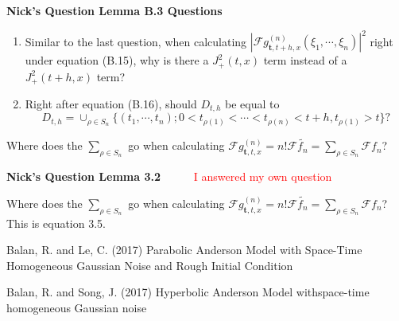 \documentclass[a4paper,11pt]{article}
\numberwithin{equation}{section}
\theoremstyle{plain}
\theoremstyle{definition}
\newcounter{NQ}
\newenvironment{NickQuestion}[1][] %
{\refstepcounter{NQ}
	\begin{mdframed}[backgroundcolor=lightgray]\textbf{Nick's Question \theNQ \: #1~~}~~~\noindent}%
	{\end{mdframed}}
\numberwithin{NQ}{section}
\numberwithin{LQ}{section}
\numberwithin{ZQ}{section}
\begin{document}
\begin{NickQuestion}[Lemma B.3 Questions]
\begin{enumerate}
\noindent\textbf{Relation to Raluca's paper \cite{BS2017}:} The corresponding result is found in Lemma 7.2 \cite{BS2017}. The proof is exactly the same up until Raluca's equation (80). However in equation (81), you can see that Raluca took a different approach to bound $\psi_{t,h,x}^{(n)}(\textbf{t,t})$ and in return the $A_n(t,h,x)$ function.

\textbf{Underline (2):} Why are we able to factor as was done in this step. Shouldn't we say that 
	\begin{align*}
			| \mathcal{F} & (g_{ \textbf{t}, t+h, x }^{(n)}  - g_{ \textbf{t}, t, x }^{(n)} ) (\xi_1 , \cdots , \xi_n)|^2 
			\\= \bigg| \lambda^n \prod_{k=1}^n & \exp\left( -\frac{1}{2}\frac{ t_{\rho(k+1)}  - t_{\rho(k)} }{ t_{\rho(k)}t_{\rho(k+1)} } \left| \sum_{j=1}^k t_{\rho(j)}\xi_{\rho(j)} \right|^2 \right) \cdots
			\\& - \lambda^n \prod_{k=1}^n \exp\left( -\frac{1}{2}\frac{ t_{\sigma(k+1)}  - t_{\sigma(k)} }{ t_{\sigma(k)}t_{\sigma(k+1)} } \left| \sum_{j=1}^k t_{\sigma(j)}\xi_{\sigma(j)} \right|^2 \right) \cdots \bigg|^2.	\end{align*}
In other words, the permutations are different so we can't factor like is done to get the first inequality after equation (B.11). 
	\item Similar to the last question, when calculating $ |\mathcal{F} g_{ \textbf{t}, t+h, x }^{(n)}(\xi_1, \cdots, \xi_n)|^2 $ right under equation (B.15), why is there a $J_+^2(t,x)$ term instead of a $J_+^2(t+h,x)$ term?  

	\item Right after equation (B.16), should $D_{t,h}$ be equal to 
		\[
			D_{t,h} = \cup_{\rho \in S_n} \{ (t_1, \cdots, t_n) ; 0 < t_{\rho(1)} < \cdots < t_{\rho(n)} < t+h , t_{\rho(1)} > t \}?
		\]
\end{enumerate}
\end{NickQuestion}[Lemma 3.2] Where does the $\sum_{\rho \in S_n}$ go when calculating $\mathcal{F}g_{\textbf{t},t,x}^{(n)} = n!\mathcal{F}\tilde{f_n} = \sum_{\rho \in S_n}\mathcal{F}f_n$?

\begin{NickQuestion}[Lemma 3.2] 
	\textcolor{red}{I answered my own question}
	
	Where does the $\sum_{\rho \in S_n}$ go when calculating $\mathcal{F}g_{\textbf{t},t,x}^{(n)} = n!\mathcal{F}\tilde{f_n} = \sum_{\rho \in S_n}\mathcal{F}f_n$? This is equation 3.5. 
\end{NickQuestion}

\begin{thebibliography}{999}
	Balan, R. and Le, C. (2017)
	\newblock Parabolic Anderson Model with Space-Time Homogeneous Gaussian Noise and Rough Initial Condition
	
	Balan, R. and Song, J. (2017)
	\newblock Hyperbolic Anderson Model withspace-time homogeneous Gaussian noise
\end{thebibliography}
\end{document}

